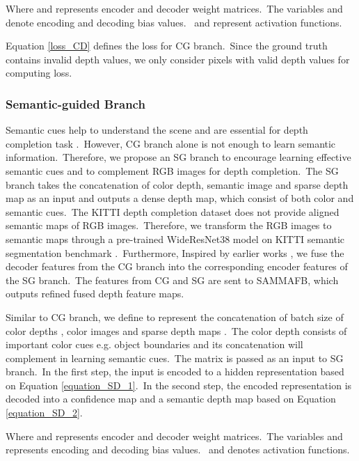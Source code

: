 \documentclass{ieeeaccess}
\begin{document}
Where  and  represents encoder and decoder weight matrices.~The variables   and  denote encoding and decoding bias values.~ and  represent activation functions.

Equation \ref{loss_CD} defines the  loss for CG branch.~Since the ground truth contains invalid depth values, we only consider pixels with valid depth values for computing loss.

\subsubsection{Semantic-guided Branch}
Semantic cues help to understand the scene and are essential for depth completion task \cite{semantic}.~However, CG branch alone is not enough to learn semantic information.~Therefore, we propose an SG branch to encourage learning effective semantic cues and to complement RGB images for depth completion.~The SG branch takes the concatenation of color depth, semantic image and sparse depth map as an input and outputs a dense depth map, which consist of both color and semantic cues.~The KITTI depth completion dataset does not provide aligned semantic maps of RGB images.~Therefore, we transform the RGB images to semantic maps through a pre-trained WideResNet38 \cite{wu2016wider} model on KITTI semantic segmentation benchmark \cite{Alhaija2018IJCV}.~Furthermore, Inspired by earlier works \cite{tang2020learning,hu2020PENet}, we fuse the decoder features from the CG branch into the corresponding encoder features of the SG branch.~The features from CG and SG are sent to SAMMAFB, which outputs refined fused depth feature maps.





Similar to CG branch, we define  to represent the concatenation of batch size  of color depths , color images  and sparse depth maps .~The color depth consists of important color cues e.g. object boundaries and its concatenation will complement in learning semantic cues.~The matrix  is passed as an input to SG branch.~In the first step, the input is encoded to a hidden representation  based on Equation \ref{equation_SD_1}.~In the second step, the encoded representation  is decoded into a confidence map  and a semantic depth map  based on Equation \ref{equation_SD_2}. 



Where  and  represents encoder and decoder weight matrices.~The variables  and  represents encoding and decoding bias values.~ and  denotes activation functions.
\end{document}
